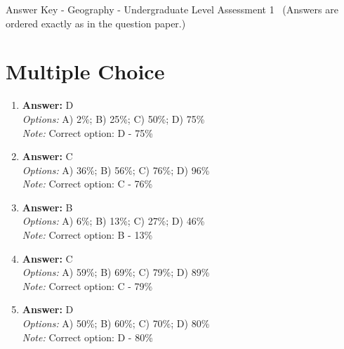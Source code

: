 \documentclass[12pt]{article}
\begin{document}
\begin{center}
Answer Key - Geography - Undergraduate Level Assessment 1 \
\small (Answers are ordered exactly as in the question paper.)
\end{center}

\section*{Multiple Choice}
\begin{enumerate}[label=\arabic*.]
\item \textbf{Answer:} D
\\ \textit{Options:} A) 2\%; B) 25\%; C) 50\%; D) 75\%
\\ \textit{Note:} Correct option: D - 75\%
\item \textbf{Answer:} C
\\ \textit{Options:} A) 36\%; B) 56\%; C) 76\%; D) 96\%
\\ \textit{Note:} Correct option: C - 76\%
\item \textbf{Answer:} B
\\ \textit{Options:} A) 6\%; B) 13\%; C) 27\%; D) 46\%
\\ \textit{Note:} Correct option: B - 13\%
\item \textbf{Answer:} C
\\ \textit{Options:} A) 59\%; B) 69\%; C) 79\%; D) 89\%
\\ \textit{Note:} Correct option: C - 79\%
\item \textbf{Answer:} D
\\ \textit{Options:} A) 50\%; B) 60\%; C) 70\%; D) 80\%
\\ \textit{Note:} Correct option: D - 80\%
\end{enumerate}
\end{document}
